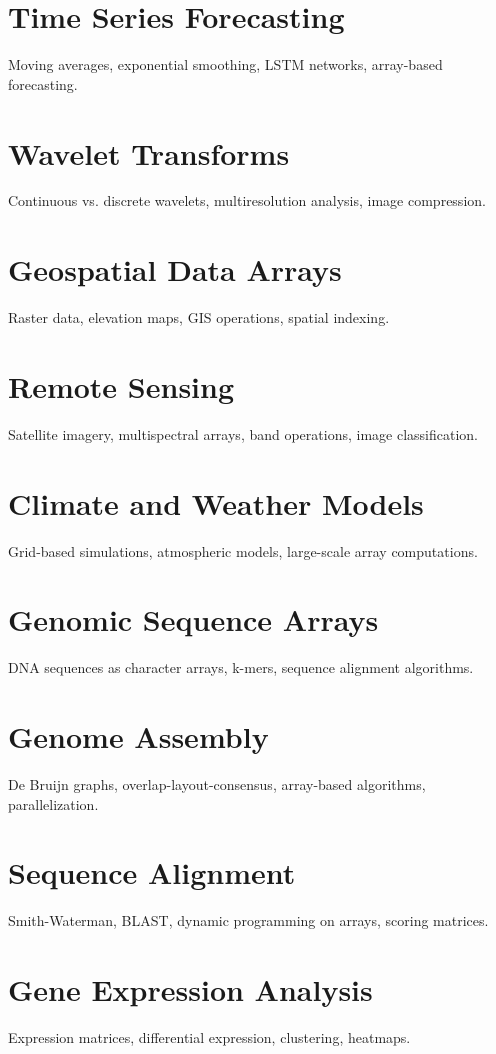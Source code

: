 \chapter{Time Series Forecasting}
Moving averages, exponential smoothing, LSTM networks, array-based forecasting.

\chapter{Wavelet Transforms}
Continuous vs. discrete wavelets, multiresolution analysis, image compression.


\chapter{Geospatial Data Arrays}
Raster data, elevation maps, GIS operations, spatial indexing.

\chapter{Remote Sensing}
Satellite imagery, multispectral arrays, band operations, image classification.

\chapter{Climate and Weather Models}
Grid-based simulations, atmospheric models, large-scale array computations.

\chapter{Genomic Sequence Arrays}
DNA sequences as character arrays, k-mers, sequence alignment algorithms.

\chapter{Genome Assembly}
De Bruijn graphs, overlap-layout-consensus, array-based algorithms, parallelization.

\chapter{Sequence Alignment}
Smith-Waterman, BLAST, dynamic programming on arrays, scoring matrices.

\chapter{Gene Expression Analysis}
Expression matrices, differential expression, clustering, heatmaps.

